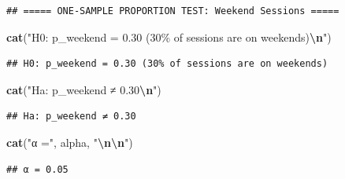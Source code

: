 \documentclass[
  12pt,
]{article}
\newenvironment{Shaded}{\begin{snugshade}}{\end{snugshade}}
\newcommand{\CommentTok}[1]{\textcolor[rgb]{0.56,0.35,0.01}{\textit{#1}}}
\newcommand{\ConstantTok}[1]{\textcolor[rgb]{0.56,0.35,0.01}{#1}}
\newcommand{\FunctionTok}[1]{\textcolor[rgb]{0.13,0.29,0.53}{\textbf{#1}}}
\newcommand{\NormalTok}[1]{#1}
\newcommand{\OtherTok}[1]{\textcolor[rgb]{0.56,0.35,0.01}{#1}}
\newcommand{\SpecialCharTok}[1]{\textcolor[rgb]{0.81,0.36,0.00}{\textbf{#1}}}
\newcommand{\StringTok}[1]{\textcolor[rgb]{0.31,0.60,0.02}{#1}}
\begin{document}
\begin{verbatim}
## ===== ONE-SAMPLE PROPORTION TEST: Weekend Sessions =====
\end{verbatim}

\begin{Shaded}
\begin{Highlighting}[]
\FunctionTok{cat}\NormalTok{(}\StringTok{"H0: p\_weekend = 0.30 (30\% of sessions are on weekends)}\SpecialCharTok{\textbackslash{}n}\StringTok{"}\NormalTok{)}
\end{Highlighting}
\end{Shaded}

\begin{verbatim}
## H0: p_weekend = 0.30 (30% of sessions are on weekends)
\end{verbatim}

\begin{Shaded}
\begin{Highlighting}[]
\FunctionTok{cat}\NormalTok{(}\StringTok{"Ha: p\_weekend ≠ 0.30}\SpecialCharTok{\textbackslash{}n}\StringTok{"}\NormalTok{)}
\end{Highlighting}
\end{Shaded}

\begin{verbatim}
## Ha: p_weekend ≠ 0.30
\end{verbatim}

\begin{Shaded}
\begin{Highlighting}[]
\FunctionTok{cat}\NormalTok{(}\StringTok{"α ="}\NormalTok{, alpha, }\StringTok{"}\SpecialCharTok{\textbackslash{}n\textbackslash{}n}\StringTok{"}\NormalTok{)}
\end{Highlighting}
\end{Shaded}

\begin{verbatim}
## α = 0.05
\end{verbatim}

\begin{Shaded}
\end{Shaded}
\end{document}
